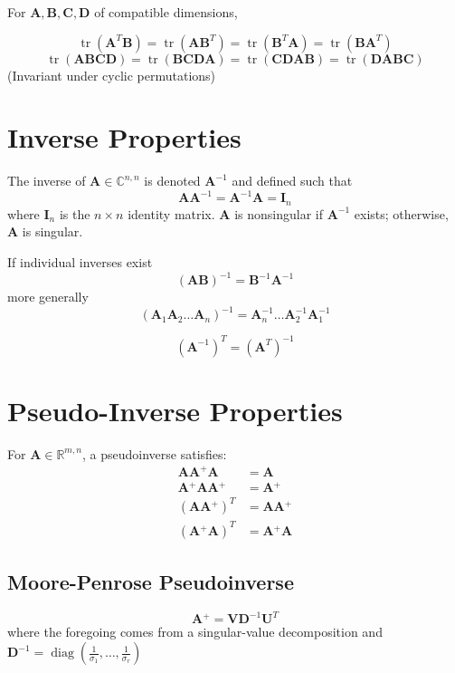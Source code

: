 \documentclass{book}
\newcommand{\mA}{\mathbf{A}}
\newcommand{\mB}{\mathbf{B}}
\newcommand{\mC}{\mathbf{C}}
\newcommand{\mD}{\mathbf{D}}
\newcommand{\mI}{\mathbf{I}}
\newcommand{\mU}{\mathbf{U}}
\newcommand{\mV}{\mathbf{V}}
\DeclareMathOperator{\diag}{diag}
\DeclareMathOperator{\trace}{tr}
\newcommand{\sCnn}{\mathbb{C}^{n,n}}
\newcommand{\sRmn}{\mathbb{R}^{m,n}}
\newcommand{\pinv}{\!^+}
\begin{document}
For $\mA,\mB,\mC,\mD$ of compatible dimensions,

\begin{equation}
\trace(\mA^T\mB)=\trace(\mA\mB^T)=\trace(\mB^T\mA)=\trace(\mB\mA^T)
\end{equation}
\begin{equation}
\trace(\mA\mB\mC\mD)=\trace(\mB\mC\mD\mA)=\trace(\mC\mD\mA\mB)=\trace(\mD\mA\mB\mC)
\end{equation}
(Invariant under cyclic permutations)



\chapter{Inverse Properties}
The inverse of $\mA\in\sCnn$ is denoted $\mA^{-1}$ and defined such that
\begin{equation}
\mA\mA^{-1}=\mA^{-1}\mA=\mI_n
\end{equation}
where $\mI_n$ is the $n \times n$ identity matrix. $\mA$ is nonsingular if $\mA^{-1}$ exists; otherwise, $\mA$ is singular.


If individual inverses exist
\begin{equation}
(\mA\mB)^{-1}=\mB^{-1}\mA^{-1}
\end{equation}
more generally
\begin{equation}
(\mA_1\mA_2\ldots\mA_n)^{-1}=\mA_n^{-1}\ldots\mA_2^{-1}\mA_1^{-1}
\end{equation}

\begin{equation}
(\mA^{-1})^T=(\mA^T)^{-1}
\end{equation}




\chapter{Pseudo-Inverse Properties}
For $\mA\in\sRmn$, a pseudoinverse satisfies:
\begin{align}
\mA\mA\pinv\mA      &= \mA         \\
\mA\pinv\mA\mA\pinv &= \mA\pinv    \\
(\mA\mA\pinv)^T     &= \mA\mA\pinv \\
(\mA\pinv\mA)^T     &= \mA\pinv\mA
\end{align}

\section{Moore-Penrose Pseudoinverse}
\begin{equation}
\mA\pinv = \mV \mD^{-1} \mU^T
\end{equation}
where the foregoing comes from a singular-value decomposition and $\mD^{-1}=\diag(\frac{1}{\sigma_1},\ldots,\frac{1}{\sigma_r})$
\end{document}
